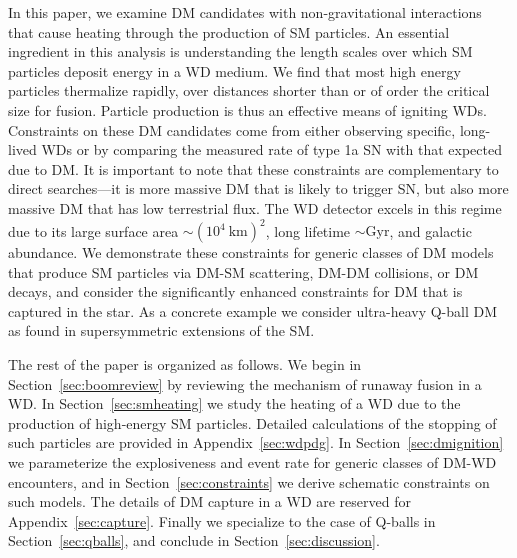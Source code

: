 In this paper, we examine DM candidates with non-gravitational interactions that cause heating through the production of SM particles.
An essential ingredient in this analysis is understanding the length scales over which SM particles deposit energy in a WD medium.
We find that most high energy particles thermalize rapidly, over distances shorter than or of order the critical size for fusion. 
Particle production is thus an effective means of igniting WDs. 
Constraints on these DM candidates come from either observing specific, long-lived WDs or by comparing the measured rate of type 1a SN with that expected due to DM.
It is important to note that these constraints are complementary to direct searches---it is more massive DM that is likely to trigger SN, but also more massive DM that has low terrestrial flux.
The WD detector excels in this regime due to its large surface area $\sim (10^4~\text{km})^2$, long lifetime $\sim \text{Gyr}$, and galactic abundance.
We demonstrate these constraints for generic classes of DM models that produce SM particles via DM-SM scattering, DM-DM collisions, or DM decays, and consider the significantly enhanced constraints for DM that is captured in the star.
As a concrete example we consider ultra-heavy Q-ball DM as found in supersymmetric extensions of the SM. 

The rest of the paper is organized as follows.
We begin in Section~\ref{sec:boomreview} by reviewing the mechanism of runaway fusion in a WD.
In Section~\ref{sec:smheating} we study the heating of a WD due to the production of high-energy SM particles.
Detailed calculations of the stopping of such particles are provided in Appendix~\ref{sec:wdpdg}.
In Section~\ref{sec:dmignition} we parameterize the explosiveness and event rate for generic classes of DM-WD encounters, and in Section~\ref{sec:constraints} we derive schematic constraints on such models.
The details of DM capture in a WD are reserved for Appendix~\ref{sec:capture}.
Finally we specialize to the case of Q-balls in Section~\ref{sec:qballs}, and conclude in Section~\ref{sec:discussion}.